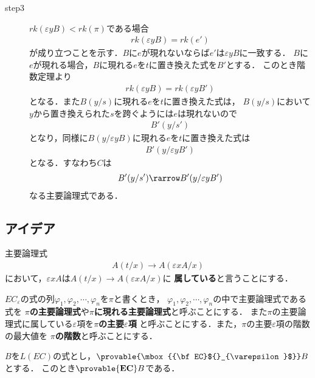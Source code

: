 \begin{metaprf}
\begin{description}
			\item[step3]
				$rk(\varepsilon y B) < rk(\pi)$である場合
				\begin{align}
					rk(\varepsilon y B) = rk(e')
				\end{align}
				が成り立つことを示す．$B$に$e$が現れないならば$e'$は$\varepsilon y B$に一致する．
				$B$に$e$が現れる場合，$B$に現れる$e$を$t$に置き換えた式を$B'$とする．
				このとき階数定理より
				\begin{align}
					rk(\varepsilon y B) = rk(\varepsilon y B')
				\end{align}
				となる．また$B(y/s)$に現れる$e$を$t$に置き換えた式は，
				$B(y/s)$において$y$から置き換えられた$s$を跨ぐようには$e$は現れないので
				\begin{align}
					B'(y/s')
				\end{align}
				となり，同様に$B(y/\varepsilon y B)$に現れる$e$を$t$に置き換えた式は
				\begin{align}
					B'(y/\varepsilon y B')
				\end{align}
				となる．すなわち$C$は
				\begin{align}
					B'(y/s') \rarrow B'(y/\varepsilon y B')
				\end{align}
				なる主要論理式である．
				\QED
		\end{description}
	\end{metaprf}
	
\subsection{アイデア}
	
	主要論理式
	\begin{align}
		A(t/x) \rightarrow A(\varepsilon x A / x)
	\end{align}
	において，$\varepsilon x A$は$A(t/x) \rightarrow A(\varepsilon x A / x)$に
	{\bf 属している}と言うことにする．
	
	$EC_{\varepsilon}$の式の列$\varphi_{1},\varphi_{2},\cdots,\varphi_{n}$を$\pi$と書くとき，
	$\varphi_{1},\varphi_{2},\cdots,\varphi_{n}$の中で主要論理式である式を
	{\bf $\pi$の主要論理式}や{\bf $\pi$に現れる主要論理式}と呼ぶことにする．
	また$\pi$の主要論理式に属している$\varepsilon$項を{\bf $\pi$の主要$\varepsilon$項}
	と呼ぶことにする．また，$\pi$の主要$\varepsilon$項の階数の最大値を
	{\bf $\pi$の階数}と呼ぶことにする．
	
	\begin{screen}
		\begin{metathm}[第一イプシロン定理]
			$B$を$L(EC)$の式とし，$\provable{\mbox{{\bf EC}${}_{\varepsilon}$}} B$とする．
			このとき$\provable{\mbox{{\bf EC}}} B$である．
		\end{metathm}
	\end{screen}
	
